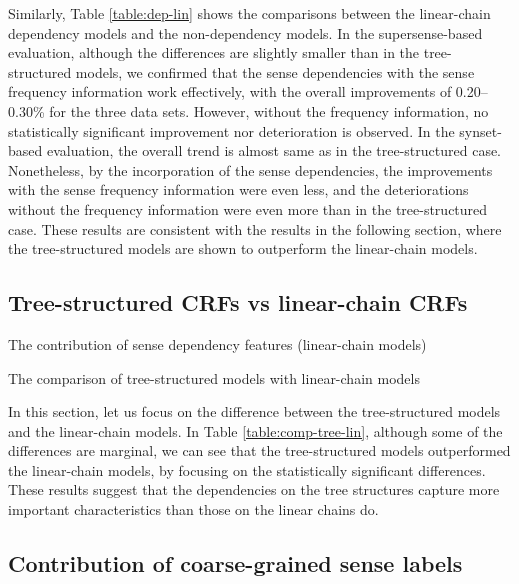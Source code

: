\documentclass[english]{jnlp_1.4}
\begin{document}
Similarly, Table \ref{table:dep-lin} shows the comparisons between the linear-chain dependency models and the non-dependency models.
In the supersense-based evaluation, although the differences are slightly smaller than in the tree-structured models, we confirmed that the sense dependencies with the sense frequency information work effectively, with the overall improvements of 0.20--0.30\% for the three data sets.
However, without the frequency information, no statistically significant improvement nor deterioration is observed.
In the synset-based evaluation, the overall trend is almost same as in the tree-structured case.
Nonetheless, by the incorporation of the sense dependencies, the improvements with the sense frequency information were even less, and the deteriorations without the frequency information were even more than in the tree-structured case.
These results are consistent with the results in the following section, where the tree-structured models are shown to outperform the linear-chain models.



\subsection{Tree-structured CRFs vs linear-chain CRFs}


\begin{table}[b]
\caption{The contribution of sense dependency features (linear-chain models)}
\label{table:dep-lin}

\end{table}
\begin{table}[b]
\caption{The comparison of tree-structured models with linear-chain models}
\label{table:comp-tree-lin}

\end{table}

In this section, let us focus on the difference between the tree-structured models and the linear-chain models.
In Table \ref{table:comp-tree-lin}, although some of the differences are marginal, we can see that the tree-structured models outperformed the linear-chain models, by focusing on the statistically significant differences.
These results suggest that the dependencies on the tree structures capture more important characteristics than those on the linear chains do.


\subsection{Contribution of coarse-grained sense labels}
\end{document}
